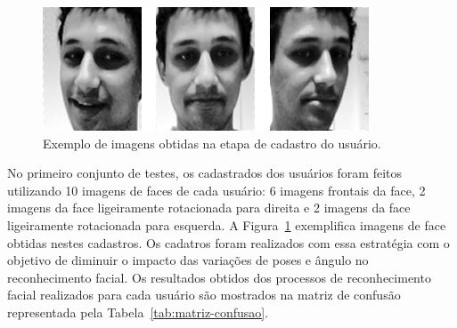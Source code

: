 		\begin{figure}[htb]
			\begin{center}
				\includegraphics[scale=0.4]{figuras/4.ProblemaEProposta/face-registro.png}
			\end{center}
			\caption{Exemplo de imagens obtidas na etapa de cadastro do usuário.}
			\label{fig:imgs-cadastro}
		\end{figure}	

	No primeiro conjunto de testes, os cadastrados dos usuários foram feitos utilizando 10 imagens de faces de cada usuário: 6 imagens frontais da face, 2 imagens da face ligeiramente rotacionada para direita e 2 imagens da face ligeiramente rotacionada para esquerda. A Figura~\ref{fig:imgs-cadastro} exemplifica imagens de face obtidas nestes cadastros. Os cadatros foram realizados com essa estratégia com o objetivo de diminuir o impacto das variações de poses e ângulo no reconhecimento facial. Os resultados obtidos dos processos de reconhecimento facial realizados para cada usuário são mostrados na matriz de confusão representada pela Tabela~\ref{tab:matriz-confusao}. 

